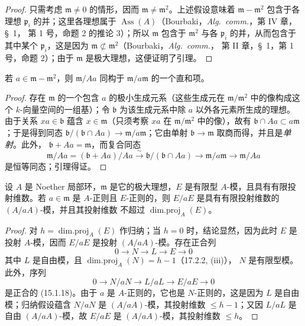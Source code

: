 \begin{proof}
只需考虑 $\mathfrak{m}\neq0$ 的情形，因而
$\mathfrak{m}\neq\mathfrak{m}^2$。上述假设意味着
$\mathfrak{m}-\mathfrak{m}^2$ 包含于各理想 $\mathfrak{p}_i$ 的并；这里各理想属于
$\operatorname{Ass}(A)$（Bourbaki，\emph{Alg.~comm.}，第 IV 章，\S~1，
第 1 号，命题 2 的推论 3）；所以 $\mathfrak{m}$ 包含于 $\mathfrak{m}^2$
与各 $\mathfrak{p}_i$ 的并，从而包含于其中某个 $\mathfrak{p}_i$，这是因为
$\mathfrak{m}\not\subset\mathfrak{m}^2$（Bourbaki，\emph{Alg.~comm.}，
第 II 章，\S~1，第 1 号，命题 2）；由于 $\mathfrak{m}$ 是极大理想，这便证明了引理。
\end{proof}

\begin{lemma}[17.3.1.3]
\label{0.17.3.1.3-fr}
若 $a\in\mathfrak{m}-\mathfrak{m}^2$，则 $\mathfrak{m}/Aa$ 同构于
$\mathfrak{m}/a\mathfrak{m}$ 的一个直和项。
\end{lemma}

\begin{proof}
存在 $\mathfrak{m}$ 的一个包含 $a$ 的极小生成元系（这些生成元在
$\mathfrak{m}/\mathfrak{m}^2$ 中的像构成这个 $k$-向量空间的一组基）；令
$\mathfrak{b}$ 为该生成元系中除 $a$ 以外各元素所生成的理想。由于关系
$xa\in\mathfrak{b}$ 蕴含 $x\in\mathfrak{m}$（只须考察 $xa$ 在
$\mathfrak{m}/\mathfrak{m}^2$ 中的像），故有
$\mathfrak{b}\cap Aa\subset a\mathfrak{m}$；于是得到同态
$\mathfrak{b}/(\mathfrak{b}\cap Aa)\longrightarrow
\mathfrak{m}/a\mathfrak{m}$；它由单射
$\mathfrak{b}\longrightarrow\mathfrak{m}$ 取商而得，并且是\emph{单射}。此外，
$\mathfrak{b}+Aa=\mathfrak{m}$，而复合同态
\[
  \mathfrak{m}/Aa=(\mathfrak{b}+Aa)/Aa
  \xrightarrow{\sim}\mathfrak{b}/(\mathfrak{b}\cap Aa)
  \longrightarrow\mathfrak{m}/a\mathfrak{m}
  \longrightarrow\mathfrak{m}/Aa
\]
是恒等同态；引理得证。
\end{proof}

\begin{lemma}[17.3.1.4]
\label{0.17.3.1.4-fr}
设 $A$ 是 Noether 局部环，$\mathfrak{m}$ 是它的极大理想，$E$ 是有限型
$A$-模，且具有有限投射维数。若 $a\in\mathfrak{m}$ 是 $A$-正则且
$E$-正则的，则 $E/aE$ 是具有有限投射维数的 $(A/aA)$-模，并且其投射维数
不超过 $\operatorname{dim.proj}_A(E)$。
\end{lemma}

\begin{proof}
对 $h=\operatorname{dim.proj}_A(E)$ 作归纳；当 $h=0$ 时，结论显然，因为此时
$E$ 是投射 $A$-模，因而 $E/aE$ 是投射 $(A/aA)$-模。存在正合列
\[
  0\longrightarrow N\longrightarrow L\longrightarrow E\longrightarrow0
\]
其中 $L$ 是自由模，且 $\operatorname{dim.proj}_A(N)=h-1$（17.2.2, (iii)），
$N$ 是有限型模。此外，序列
\[
  0\longrightarrow N/aN\longrightarrow L/aL\longrightarrow E/aE
  \longrightarrow0
\]
是正合的 (15.1.18)。由于 $a$ 是 $A$-正则的，它也是 $N$-正则的，这是因为
$L$ 是自由模；归纳假设蕴含 $N/aN$ 是 $(A/aA)$-模，其投射维数
$\leq h-1$；又因 $L/aL$ 是自由 $(A/aA)$-模，故 $E/aE$ 是
$(A/aA)$-模，其投射维数 $\leq h$。
\end{proof}

